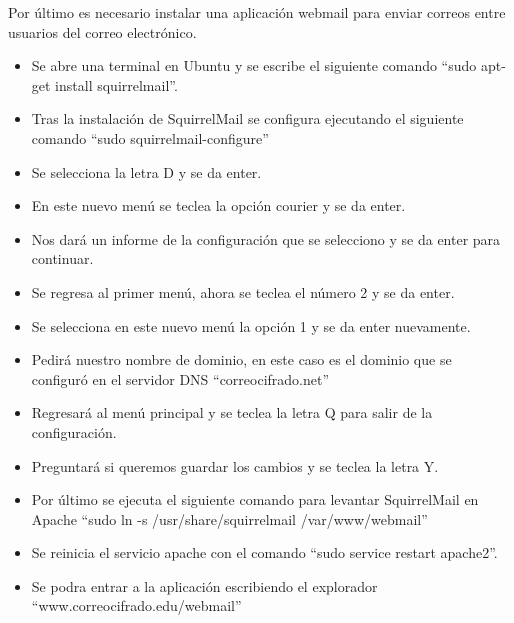 \documentclass[12pt,oneside,onecolumn,openany]{report}
\begin{document}
Por último es necesario instalar una aplicación webmail para enviar correos entre usuarios del correo electrónico.
\begin{itemize}
 \item Se abre una terminal en Ubuntu y se escribe el siguiente comando “sudo apt-get install squirrelmail”.
 \item Tras la instalación de SquirrelMail se configura ejecutando el siguiente comando “sudo squirrelmail-configure”
 \item Se selecciona la letra D y se da enter.
 \item En este nuevo menú se teclea la opción courier y se da enter.
 \item Nos dará un informe de la configuración que se selecciono y se da enter para continuar.
 \item Se regresa al primer menú, ahora se teclea el número 2 y se da enter.
 \item Se selecciona en este nuevo menú la opción 1 y se da enter nuevamente.
 \item Pedirá nuestro nombre de dominio, en este caso es el dominio que se configuró en el servidor DNS “correocifrado.net”
 \item Regresará al menú principal y se teclea la letra Q para salir de la configuración.
 \item Preguntará si queremos guardar los cambios y se teclea la letra Y.
 \item Por último se ejecuta el siguiente comando para levantar SquirrelMail en Apache “sudo ln -s /usr/share/squirrelmail /var/www/webmail”
 \item Se reinicia el servicio apache con el comando “sudo service restart apache2”.
 \item Se podra entrar a la aplicación escribiendo el explorador “www.correocifrado.edu/webmail”
\end{itemize}
\end{document}
